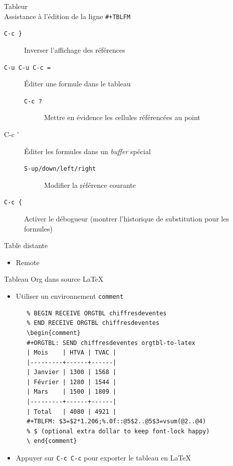 \documentclass[presentation,t,hideothersubsections]{beamer}
\begin{document}
\begin{frame}[fragile,label=sec-3-3-13]{Tableur \\ Assistance à l'édition de la ligne \texttt{\#+TBLFM}}
 \begin{description}
\item[\texttt{C-c \}}] Inverser l'affichage des références
\item[\texttt{C-u C-u C-c =}] Éditer une formule dans le tableau
\begin{description}
\item[\texttt{C-c ?}] Mettre en évidence les cellules référencées au point
\end{description}
\item[C-c '] Éditer les formules dans un \emph{buffer} spécial
\begin{description}
\item[\texttt{S-up/down/left/right}] Modifier la référence courante
\end{description}
\item[\texttt{C-c \{}] Activer le débogueur (montrer l'historique de substitution pour les
formules)
\end{description}
\end{frame}
\begin{frame}[label=sec-3-3-14]{Table distante}
\begin{itemize}
\item Remote
\end{itemize}
\end{frame}
\begin{frame}[fragile,label=sec-3-3-15]{Tableau Org dans source \LaTeX{}}
 \begin{itemize}
\item Utiliser un environnement \texttt{comment}

\lstset{language=TeX,numbers=none}
\begin{lstlisting}
   % BEGIN RECEIVE ORGTBL chiffresdeventes
   % END RECEIVE ORGTBL chiffresdeventes
   \begin{comment}
   #+ORGTBL: SEND chiffresdeventes orgtbl-to-latex
   | Mois    | HTVA | TVAC |
   |---------+------+------|
   | Janvier | 1300 | 1568 |
   | Février | 1280 | 1544 |
   | Mars    | 1500 | 1809 |
   |---------+------+------|
   | Total   | 4080 | 4921 |
   #+TBLFM: $3=$2*1.206;%.0f::@5$2..@5$3=vsum(@2..@4)
   % $ (optional extra dollar to keep font-lock happy)
   \ end{comment}
\end{lstlisting}

\item Appuyer sur \texttt{C-c C-c} pour exporter le tableau en \LaTeX{}
\end{itemize}
\end{frame}
\end{document}
